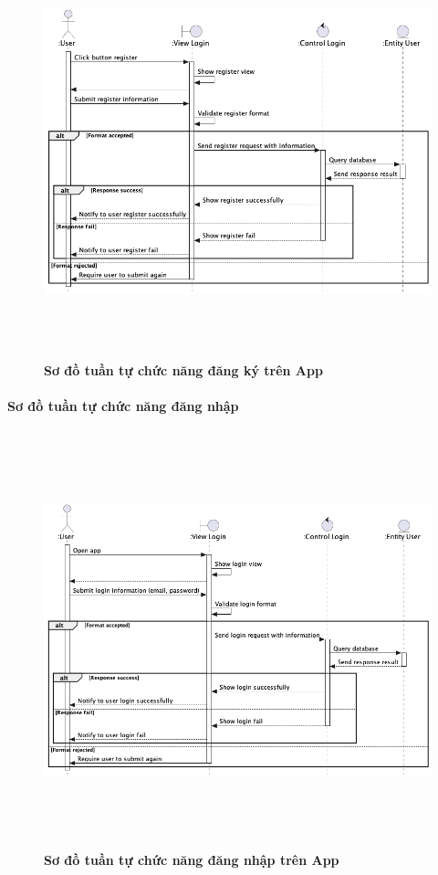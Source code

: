 \documentclass{article}%
\begin{document}
    \begin{figure}[H]
         \centering
         \includegraphics[width=16cm,height=12cm]{Images/mobile_app/register.png}
         \caption[Sơ đồ tuần tự chức năng đăng ký trên App]{\bfseries \fontsize{12pt}{0pt}
         \selectfont Sơ đồ tuần tự chức năng đăng ký trên App}
         \label{hinh21} %
    \end{figure}

\paragraph{Sơ đồ tuần tự chức năng đăng nhập}
\mbox{}

    \begin{figure}[H]
         \centering
         \includegraphics[width=16cm,height=12cm]{Images/mobile_app/login.png}
         \caption[Sơ đồ tuần tự chức năng đăng nhập trên App]{\bfseries \fontsize{12pt}{0pt}
         \selectfont Sơ đồ tuần tự chức năng đăng nhập trên App}
         \label{hinh21} %
    \end{figure}
\end{document}

